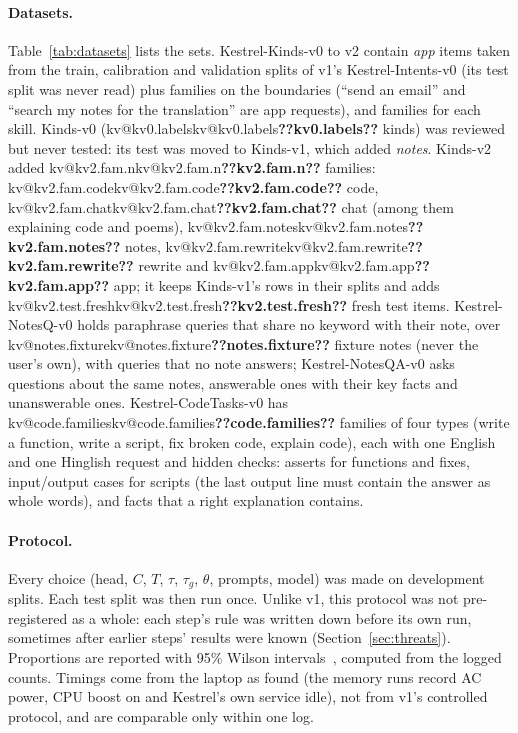 \documentclass[11pt,a4paper]{article}
\makeatletter
\DeclareRobustCommand{\kv}[1]{\ifcsname kv@#1\endcsname\csname kv@#1\endcsname\else\textbf{??#1??}\fi}
\makeatother
\begin{document}
\paragraph{Datasets.} Table~\ref{tab:datasets} lists the sets. Kestrel-Kinds-v0 to v2 contain \emph{app} items
taken from the train, calibration and validation splits of v1's Kestrel-Intents-v0 (its test split was never read)
plus families on the boundaries (``send an email'' and ``search my notes for the translation'' are app requests), and
families for each skill. Kinds-v0 (\kv{kv0.labels} kinds) was reviewed but never tested: its test was moved to
Kinds-v1, which added \emph{notes}. Kinds-v2 added \kv{kv2.fam.n} families: \kv{kv2.fam.code} code, \kv{kv2.fam.chat} chat (among them
explaining code and poems), \kv{kv2.fam.notes} notes, \kv{kv2.fam.rewrite} rewrite and \kv{kv2.fam.app} app; it keeps
Kinds-v1's rows in their splits and adds \kv{kv2.test.fresh} fresh test items. Kestrel-NotesQ-v0 holds paraphrase
queries that share no keyword with their note, over \kv{notes.fixture} fixture notes (never the user's own), with
queries that no note answers; Kestrel-NotesQA-v0 asks questions about the same notes, answerable ones with their key
facts and unanswerable ones. Kestrel-CodeTasks-v0 has \kv{code.families} families of four types (write a function,
write a script, fix broken code, explain code), each with one English and one Hinglish request and hidden checks:
asserts for functions and fixes, input/output cases for scripts (the last output line must contain the answer as
whole words), and facts that a right explanation contains.

\paragraph{Protocol.} Every choice (head, $C$, $T$, $\tau$, $\tau_g$, $\theta$, prompts, model) was made on development
splits. Each test split was then run once. Unlike v1, this protocol was not
pre-registered as a whole: each step's rule was written down before its own run, sometimes after earlier steps' results
were known (Section~\ref{sec:threats}). Proportions are reported with 95\% Wilson intervals~\citep{wilson1927}, computed
from the logged counts. Timings come from the laptop as found (the memory runs record AC power, CPU boost on and Kestrel's own service idle), not from
v1's controlled protocol, and are comparable only within one log.

\end{document}
